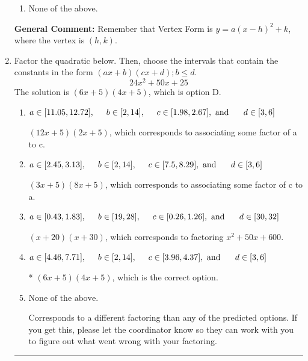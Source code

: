 \documentclass{extbook}[14pt]
\newcommand{\litem}[1]{\item #1

\rule{\textwidth}{0.4pt}}
\begin{document}
\begin{enumerate}
{\begin{enumerate}[label=\Alph*.]
\begin{multicols}{2}
\end{multicols}\item None of the above.\end{enumerate}
\textbf{General Comment:} Remember that Vertex Form is $y = a(x-h)^2+k$, where the vertex is $(h, k)$.
}
\litem{
Factor the quadratic below. Then, choose the intervals that contain the constants in the form $(ax+b)(cx+d); b \leq d.$
\[ 24x^{2} +50 x + 25 \]The solution is \( (6x + 5)(4x + 5) \), which is option D.\begin{enumerate}[label=\Alph*.]
\item \( a \in [11.05, 12.72], \hspace*{5mm} b \in [2, 14], \hspace*{5mm} c \in [1.98, 2.67], \text{ and } \hspace*{5mm} d \in [3, 6] \)

 $(12x + 5)(2x + 5)$, which corresponds to associating some factor of a to c.
\item \( a \in [2.45, 3.13], \hspace*{5mm} b \in [2, 14], \hspace*{5mm} c \in [7.5, 8.29], \text{ and } \hspace*{5mm} d \in [3, 6] \)

 $(3x + 5)(8x + 5)$, which corresponds to associating some factor of c to a.
\item \( a \in [0.43, 1.83], \hspace*{5mm} b \in [19, 28], \hspace*{5mm} c \in [0.26, 1.26], \text{ and } \hspace*{5mm} d \in [30, 32] \)

 $(x + 20)(x + 30)$, which corresponds to factoring $x^{2} +50 x + 600$.
\item \( a \in [4.46, 7.71], \hspace*{5mm} b \in [2, 14], \hspace*{5mm} c \in [3.96, 4.37], \text{ and } \hspace*{5mm} d \in [3, 6] \)

* $(6x + 5)(4x + 5)$, which is the correct option.
\item \( \text{None of the above.} \)

 Corresponds to a different factoring than any of the predicted options. If you get this, please let the coordinator know so they can work with you to figure out what went wrong with your factoring.
\end{enumerate}

}
\end{enumerate}
\end{document}
